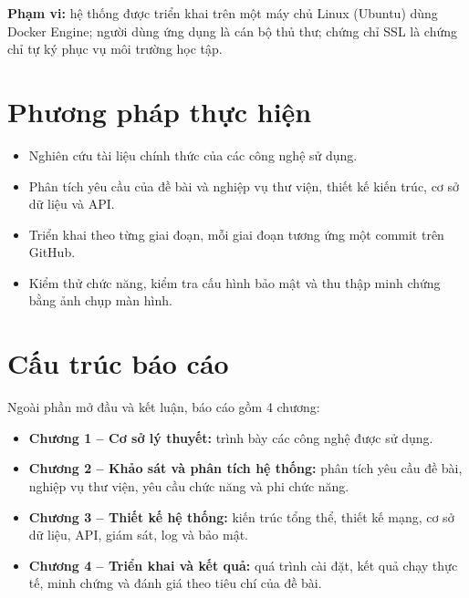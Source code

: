 \documentclass[../main.tex]{subfiles}
\begin{document}
\textbf{Phạm vi:} hệ thống được triển khai trên một máy chủ Linux (Ubuntu) dùng Docker Engine; người dùng ứng dụng là cán bộ thủ thư; chứng chỉ SSL là chứng chỉ tự ký phục vụ môi trường học tập.

\section*{Phương pháp thực hiện}
\begin{itemize}
    \item Nghiên cứu tài liệu chính thức của các công nghệ sử dụng.
    \item Phân tích yêu cầu của đề bài và nghiệp vụ thư viện, thiết kế kiến trúc, cơ sở dữ liệu và API.
    \item Triển khai theo từng giai đoạn, mỗi giai đoạn tương ứng một commit trên GitHub.
    \item Kiểm thử chức năng, kiểm tra cấu hình bảo mật và thu thập minh chứng bằng ảnh chụp màn hình.
\end{itemize}

\section*{Cấu trúc báo cáo}
Ngoài phần mở đầu và kết luận, báo cáo gồm 4 chương:
\begin{itemize}
    \item \textbf{Chương 1 -- Cơ sở lý thuyết:} trình bày các công nghệ được sử dụng.
    \item \textbf{Chương 2 -- Khảo sát và phân tích hệ thống:} phân tích yêu cầu đề bài, nghiệp vụ thư viện, yêu cầu chức năng và phi chức năng.
    \item \textbf{Chương 3 -- Thiết kế hệ thống:} kiến trúc tổng thể, thiết kế mạng, cơ sở dữ liệu, API, giám sát, log và bảo mật.
    \item \textbf{Chương 4 -- Triển khai và kết quả:} quá trình cài đặt, kết quả chạy thực tế, minh chứng và đánh giá theo tiêu chí của đề bài.
\end{itemize}
\end{document}
